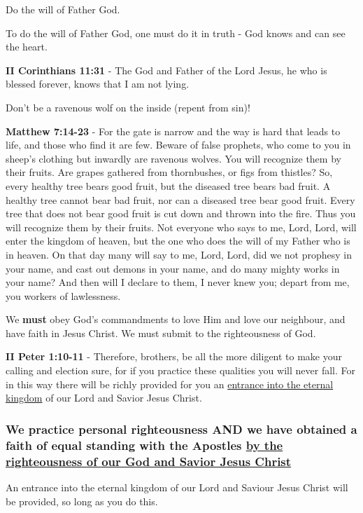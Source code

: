 \documentclass[11pt]{article}
\begin{document}
Do the will of Father God.

To do the will of Father God, one must do it in truth - God knows and can see the heart.

\textbf{II Corinthians 11:31} - The God and Father of the Lord Jesus, he who is blessed forever, knows that I am not lying.

Don't be a ravenous wolf on the inside (repent from sin)!

\textbf{Matthew 7:14-23} - For the gate is narrow and the way is hard that leads to life, and those who find it are few.  Beware of false prophets, who come to you in sheep's clothing but inwardly are ravenous wolves.  You will recognize them by their fruits. Are grapes gathered from thornbushes, or figs from thistles?  So, every healthy tree bears good fruit, but the diseased tree bears bad fruit.  A healthy tree cannot bear bad fruit, nor can a diseased tree bear good fruit.  Every tree that does not bear good fruit is cut down and thrown into the fire.  Thus you will recognize them by their fruits.  Not everyone who says to me, Lord, Lord, will enter the kingdom of heaven, but the one who does the will of my Father who is in heaven.  On that day many will say to me, Lord, Lord, did we not prophesy in your name, and cast out demons in your name, and do many mighty works in your name?  And then will I declare to them, I never knew you; depart from me, you workers of lawlessness.

We \textbf{must} obey God's commandments to love Him and love our neighbour, and have faith in Jesus Christ.
We must submit to the righteousness of God.

\textbf{II Peter 1:10-11} - Therefore, brothers, be all the more diligent to make your calling and election sure, for if you practice these qualities you will never fall. For in this way there will be richly provided for you an \uline{entrance into the eternal kingdom} of our Lord and Savior Jesus Christ.

\subsubsection{We practice personal righteousness AND we have obtained a faith of equal standing with the Apostles \underline{by the righteousness of our God and Savior Jesus Christ}}
\label{sec:org271c917}
An entrance into the eternal kingdom of our Lord and Saviour Jesus Christ will
be provided, so long as you do this.
\end{document}
